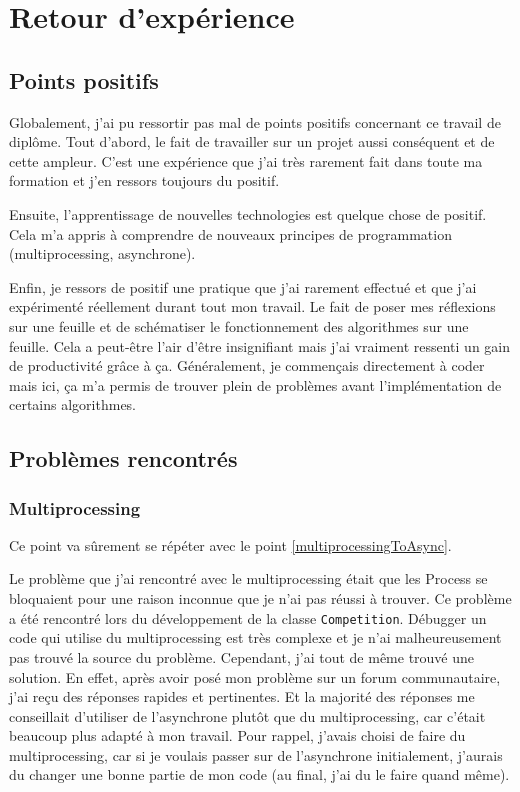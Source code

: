 \documentclass[a4paper,14pt]{extarticle}
\begin{document}
{\section{Retour d'expérience}

\subsection{Points positifs}

Globalement, j'ai pu ressortir pas mal de points positifs concernant ce travail de diplôme. Tout d'abord, le fait de travailler sur un projet aussi conséquent et de cette ampleur. C'est une expérience que j'ai très rarement fait dans toute ma formation et j'en ressors toujours du positif.

Ensuite, l'apprentissage de nouvelles technologies est quelque chose de positif. Cela m'a appris à comprendre de nouveaux principes de programmation (multiprocessing, asynchrone). 

Enfin, je ressors de positif une pratique que j'ai rarement effectué et que j'ai expérimenté réellement durant tout mon travail. Le fait de poser mes réflexions sur une feuille et de schématiser le fonctionnement des algorithmes sur une feuille. Cela a peut-être l'air d'être insignifiant mais j'ai vraiment ressenti un gain de productivité grâce à ça. Généralement, je commençais directement à coder mais ici, ça m'a permis de trouver plein de problèmes avant l'implémentation de certains algorithmes.

\subsection{Problèmes rencontrés}

\subsubsection{Multiprocessing}
Ce point va sûrement se répéter avec le point \ref{multiprocessingToAsync}.

Le problème que j'ai rencontré avec le multiprocessing était que les Process se bloquaient pour une raison inconnue que je n'ai pas réussi à trouver. Ce problème a été rencontré lors du développement de la classe \texttt{Competition}. Débugger un code qui utilise du multiprocessing est très complexe et je n'ai malheureusement pas trouvé la source du problème. Cependant, j'ai tout de même trouvé une solution. En effet, après avoir posé mon problème sur un forum communautaire, j'ai reçu des réponses rapides et pertinentes. Et la majorité des réponses me conseillait d'utiliser de l'asynchrone plutôt que du multiprocessing, car c'était beaucoup plus adapté à mon travail. Pour rappel, j'avais choisi de faire du multiprocessing, car si je voulais passer sur de l'asynchrone initialement, j'aurais du changer une bonne partie de mon code (au final, j'ai du le faire quand même).

}
\end{document}
